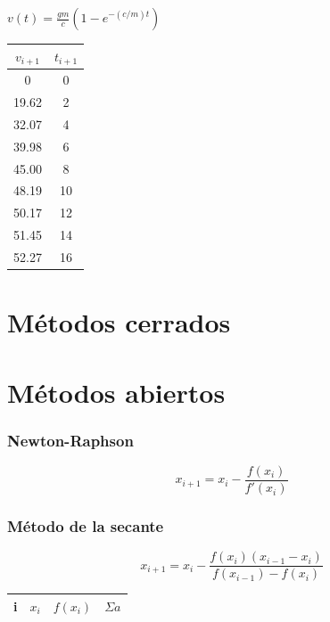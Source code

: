 \documentclass[letterpaper,12pt]{article}
\begin{document}
\begin{sloppypar}
$\displaystyle v(t)  = \frac{gm}{c} (1 - e^{-(c/m)t})$

\begin{center}
    \begin{tabular}[H]{|c|c|}\hline 
        $v_{i+1}$ & $t_{i+1}$ \\ \hline
        0 & 0 \\ \hline
        19.62 & 2 \\ \hline
        32.07 & 4 \\ \hline
        39.98 & 6 \\ \hline
        45.00 & 8 \\ \hline
        48.19 & 10 \\ \hline
        50.17 & 12  \\ \hline
        51.45 & 14 \\ \hline
        52.27 & 16 \\ \hline
    \end{tabular} 
\end{center}
\section*{Métodos cerrados}
\section*{Métodos abiertos}
\subsubsection*{Newton-Raphson}

$$x_{i+1} = x_i - \frac{f(x_i)}{f\prime (x_i)}$$

\subsubsection*{Método de la secante}
$$x_{i+1} = x_i - \frac{f(x_i) (x_{i-1} - x_i)}{f(x_{i-1}) - f(x_i)}$$

\begin{tabular}[H]{|c|c|c|c|}\hline
    i & $x_i$ & $f(x_i)$ & $\Sigma a$ \\ \hline
    
    
\end{tabular}


\end{sloppypar}
\end{document}
